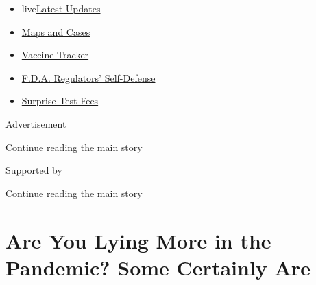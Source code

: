\begin{itemize}
\tightlist
\item
  live\href{https://www.nytimes3xbfgragh.onion/2020/09/12/world/covid-19-coronavirus.html?name=styln-coronavirus-national\&region=TOP_BANNER\&block=storyline_menu_recirc\&action=click\&pgtype=Article\&impression_id=c3673061-f52b-11ea-8964-d1c7703f36aa\&variant=undefined}{Latest
  Updates}
\item
  \href{https://www.nytimes3xbfgragh.onion/interactive/2020/us/coronavirus-us-cases.html?name=styln-coronavirus-national\&region=TOP_BANNER\&block=storyline_menu_recirc\&action=click\&pgtype=Article\&impression_id=c3673062-f52b-11ea-8964-d1c7703f36aa\&variant=undefined}{Maps
  and Cases}
\item
  \href{https://www.nytimes3xbfgragh.onion/interactive/2020/science/coronavirus-vaccine-tracker.html?name=styln-coronavirus-national\&region=TOP_BANNER\&block=storyline_menu_recirc\&action=click\&pgtype=Article\&impression_id=c3673063-f52b-11ea-8964-d1c7703f36aa\&variant=undefined}{Vaccine
  Tracker}
\item
  \href{https://www.nytimes3xbfgragh.onion/2020/09/10/us/politics/fda-coronavirus-vaccine.html?name=styln-coronavirus-national\&region=TOP_BANNER\&block=storyline_menu_recirc\&action=click\&pgtype=Article\&impression_id=c3673064-f52b-11ea-8964-d1c7703f36aa\&variant=undefined}{F.D.A.
  Regulators' Self-Defense}
\item
  \href{https://www.nytimes3xbfgragh.onion/2020/09/09/upshot/coronavirus-surprise-test-fees.html?name=styln-coronavirus-national\&region=TOP_BANNER\&block=storyline_menu_recirc\&action=click\&pgtype=Article\&impression_id=c3673065-f52b-11ea-8964-d1c7703f36aa\&variant=undefined}{Surprise
  Test Fees}
\end{itemize}

Advertisement

\protect\hyperlink{after-top}{Continue reading the main story}

Supported by

\protect\hyperlink{after-sponsor}{Continue reading the main story}

\hypertarget{are-you-lying-more-in-the-pandemic-some-certainly-are}{%
\section{Are You Lying More in the Pandemic? Some Certainly
Are}\label{are-you-lying-more-in-the-pandemic-some-certainly-are}}

